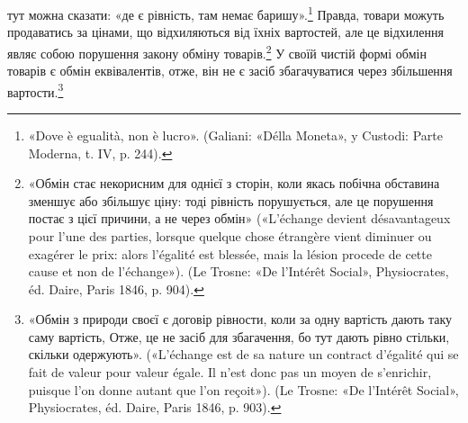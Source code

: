 \parcont{}  %
тут можна сказати: «де є рівність, там немає баришу».\footnote{
«Dove è egualità, non è lucro». (Galiani: «Délla Moneta», y Custodi:
Parte Moderna, t. IV, p. 244).
} Правда,
товари можуть продаватись за цінами, що відхиляються від їхніх
вартостей, але це відхилення являє собою порушення закону
обміну товарів.\footnote{
«Обмін стає некорисним для однієї з сторін, коли якась побічна
обставина зменшує або збільшує ціну: тоді рівність порушується, але це
порушення постає з цієї причини, а не через обмін» («L’échange devient
désavantageux pour l’une des parties, lorsque quelque chose étrangère vient
diminuer ou exagérer le prix: alors l’égalité est blessée, mais la lésion procede
de cette cause et non de l’échange»). (Le Trosne: «De l’Intérêt Social»,
Physiocrates, éd. Daire, Paris 1846, p. 904).
} У своїй чистій формі обмін товарів є обмін
еквівалентів, отже, він не є засіб збагачуватися через збільшення
вартости.\footnote{
«Обмін з природи своєї є договір рівности, коли за одну вартість
дають таку саму вартість, Отже, це не засіб для збагачення, бо тут
дають рівно стільки, скільки одержують». («L’échange est de sa nature
un contract d’égalité qui se fait de valeur pour valeur égale. Il n’est
donc pas un moyen de s’enrichir, puisque l’on donne autant que l’on
reçoit»). (Le Trosne: «De l’Intérêt Social», Physiocrates, éd. Daire, Paris
1846, p. 903).
}

